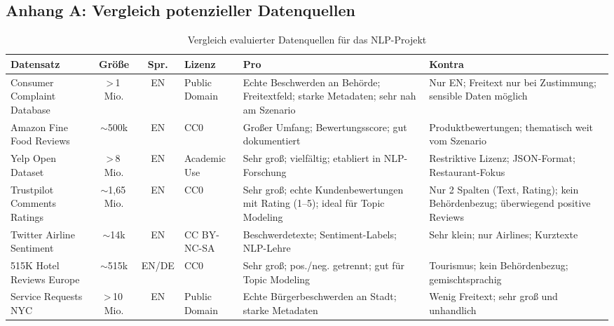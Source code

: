 \documentclass[a4paper,11pt]{article}
\renewcommand{\footnotesize}{\fontsize{10}{12}\selectfont}
\begin{document}
\subsection*{Anhang A: Vergleich potenzieller Datenquellen}

\begin{table}[H]
\centering
\caption{Vergleich evaluierter Datenquellen für das NLP-Projekt}
\label{tab:datenquellen}
\footnotesize
\setlength{\parskip}{0pt}
\renewcommand{\arraystretch}{1.4}
\begin{tabular}{>{\raggedright\arraybackslash}p{3.0cm} c c p{1.6cm} p{3.0cm} p{3.0cm}}
\toprule
\textbf{Datensatz} & \textbf{Größe} & \textbf{Spr.} & \textbf{Lizenz} & \textbf{Pro} & \textbf{Kontra} \\
\midrule
Consumer Complaint Database \parencite{cfpb2024} & {>}\,1\,Mio. & EN & Public Domain & Echte Beschwerden an Behörde; Freitextfeld; starke Metadaten; sehr nah am Szenario & Nur EN; Freitext nur bei Zustimmung; sensible Daten möglich \\
\hline
Amazon Fine Food Reviews \parencite{mcauley2013amzn} & $\sim$500k & EN & CC0 & Großer Umfang; Bewertungsscore; gut dokumentiert & Produktbewertungen; thematisch weit vom Szenario \\
\hline
Yelp Open Dataset \parencite{yelp2024} & {>}\,8\,Mio. & EN & Academic Use & Sehr groß; vielfältig; etabliert in NLP-Forschung & Restriktive Lizenz; JSON-Format; Restaurant-Fokus \\
\hline
Trustpilot Comments Ratings \parencite{trustpilot2024} & $\sim$1,65\,Mio. & EN & CC0 & Sehr groß; echte Kundenbewertungen mit Rating (1--5); ideal für Topic Modeling & Nur 2 Spalten (Text, Rating); kein Behördenbezug; überwiegend positive Reviews \\
\hline
Twitter Airline Sentiment \parencite{crowdflower2015} & $\sim$14k & EN & CC BY-NC-SA & Beschwerdetexte; Sentiment-Labels; NLP-Lehre & Sehr klein; nur Airlines; Kurztexte \\
\hline
515K Hotel Reviews Europe \parencite{jiashen2017hotel} & $\sim$515k & EN/DE & CC0 & Sehr groß; pos./neg. getrennt; gut für Topic Modeling & Tourismus; kein Behördenbezug; gemischtsprachig \\
\hline
311 Service Requests NYC \parencite{nyc311} & {>}\,10\,Mio. & EN & Public Domain & Echte Bürgerbeschwerden an Stadt; starke Metadaten & Wenig Freitext; sehr groß und unhandlich \\
\bottomrule
\end{tabular}
\end{table}
\end{document}
